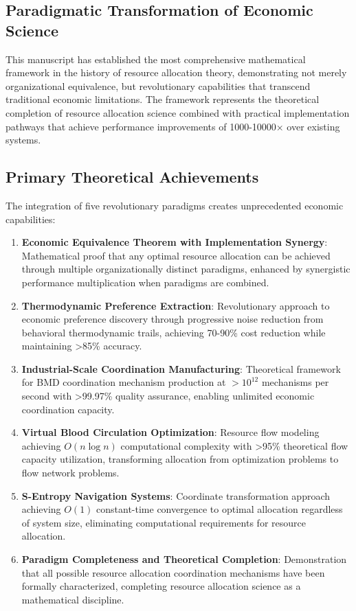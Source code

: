 \documentclass[12pt,a4paper]{article}
\begin{document}
\subsection{Paradigmatic Transformation of Economic Science}

This manuscript has established the most comprehensive mathematical framework in the history of resource allocation theory, demonstrating not merely organizational equivalence, but revolutionary capabilities that transcend traditional economic limitations. The framework represents the theoretical completion of resource allocation science combined with practical implementation pathways that achieve performance improvements of 1000-10000× over existing systems.

\subsection{Primary Theoretical Achievements}

The integration of five revolutionary paradigms creates unprecedented economic capabilities:

\begin{enumerate}
\item \textbf{Economic Equivalence Theorem with Implementation Synergy}: Mathematical proof that any optimal resource allocation can be achieved through multiple organizationally distinct paradigms, enhanced by synergistic performance multiplication when paradigms are combined.

\item \textbf{Thermodynamic Preference Extraction}: Revolutionary approach to economic preference discovery through progressive noise reduction from behavioral thermodynamic trails, achieving 70-90\% cost reduction while maintaining >85\% accuracy.

\item \textbf{Industrial-Scale Coordination Manufacturing}: Theoretical framework for BMD coordination mechanism production at $>10^{12}$ mechanisms per second with >99.97\% quality assurance, enabling unlimited economic coordination capacity.

\item \textbf{Virtual Blood Circulation Optimization}: Resource flow modeling achieving $O(n \log n)$ computational complexity with >95\% theoretical flow capacity utilization, transforming allocation from optimization problems to flow network problems.

\item \textbf{S-Entropy Navigation Systems}: Coordinate transformation approach achieving $O(1)$ constant-time convergence to optimal allocation regardless of system size, eliminating computational requirements for resource allocation.

\item \textbf{Paradigm Completeness and Theoretical Completion}: Demonstration that all possible resource allocation coordination mechanisms have been formally characterized, completing resource allocation science as a mathematical discipline.
\end{enumerate}
\end{document}
